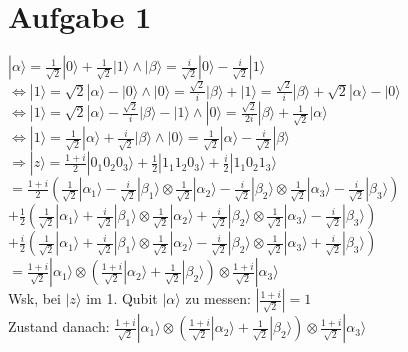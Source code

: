 \documentclass[a4paper]{scrartcl}
\begin{document}
\section*{Aufgabe 1}
$|\alpha\rangle = \frac{1}{\sqrt{2}}|0\rangle + \frac{1}{\sqrt{2}}|1\rangle \land |\beta\rangle = \frac{i}{\sqrt{2}}|0\rangle - \frac{i}{\sqrt{2}}|1\rangle$\\
$\Leftrightarrow |1\rangle = \sqrt{2} |\alpha\rangle-|0\rangle \land |0\rangle = \frac{\sqrt{2}}{i} |\beta\rangle+|1\rangle = \frac{\sqrt{2}}{i} |\beta\rangle + \sqrt{2} |\alpha\rangle-|0\rangle$\\
$\Leftrightarrow |1\rangle = \sqrt{2} |\alpha\rangle-\frac{\sqrt{2}}{i} |\beta\rangle-|1\rangle \land |0\rangle = \frac{\sqrt{2}}{2i} |\beta\rangle + \frac{1}{\sqrt{2}} |\alpha\rangle$\\
$\Leftrightarrow |1\rangle = \frac{1}{\sqrt{2}} |\alpha\rangle+\frac{i}{\sqrt{2}} |\beta\rangle \land |0\rangle =\frac{1}{\sqrt{2}} |\alpha\rangle - \frac{i}{\sqrt{2}} |\beta\rangle $\\
$\Rightarrow |z\rangle = \frac{1+i}{2} |0_1 0_2 0_3\rangle  + \frac{1}{2} |1_1 1_2 0_3\rangle + \frac{i}{2} |1_1 0_2 1_3\rangle $\\
$= \frac{1+i}{2}( \frac{1}{\sqrt{2}} |\alpha_1\rangle - \frac{i}{\sqrt{2}} |\beta_1\rangle \otimes \frac{1}{\sqrt{2}} |\alpha_2\rangle - \frac{i}{\sqrt{2}} |\beta_2\rangle \otimes \frac{1}{\sqrt{2}} |\alpha_3\rangle - \frac{i}{\sqrt{2}} |\beta_3\rangle )$\\
$+ \frac{1}{2} (\frac{1}{\sqrt{2}} |\alpha_1\rangle+\frac{i}{\sqrt{2}} |\beta_1\rangle \otimes \frac{1}{\sqrt{2}} |\alpha_2\rangle+\frac{i}{\sqrt{2}} |\beta_2\rangle \otimes \frac{1}{\sqrt{2}} |\alpha_3\rangle - \frac{i}{\sqrt{2}} |\beta_3\rangle ) $\\
$+ \frac{i}{2} (\frac{1}{\sqrt{2}} |\alpha_1\rangle+\frac{i}{\sqrt{2}} |\beta_1\rangle \otimes \frac{1}{\sqrt{2}} |\alpha_2\rangle - \frac{i}{\sqrt{2}} |\beta_2\rangle \otimes \frac{1}{\sqrt{2}} |\alpha_3\rangle+\frac{i}{\sqrt{2}} |\beta_3\rangle ) $\\
$= \frac{1+i}{\sqrt{2}} |\alpha_1\rangle \otimes (\frac{1+i}{\sqrt{2}} |\alpha_2\rangle + \frac{1}{\sqrt{2}} |\beta_2\rangle) \otimes \frac{1+i}{\sqrt{2}} |\alpha_3\rangle $\\

Wsk, bei $|z\rangle$ im 1. Qubit $|\alpha\rangle$ zu messen: $|\frac{1+i}{\sqrt{2}}| = 1$\\
Zustand danach: $\frac{1+i}{\sqrt{2}} |\alpha_1\rangle \otimes (\frac{1+i}{\sqrt{2}} |\alpha_2\rangle + \frac{1}{\sqrt{2}} |\beta_2\rangle) \otimes \frac{1+i}{\sqrt{2}} |\alpha_3\rangle $\\
\end{document}
